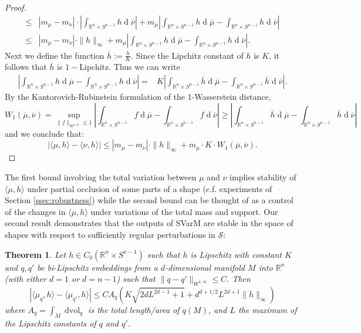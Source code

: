 \documentclass[11pt]{article}
\newtheorem{thm}{Theorem}
\newcommand{\R}{\mathbb{R}}
\begin{document}
\begin{proof}
\begin{align*}
    \leq& |m_\mu-m_\nu|\cdot\left|\int_{\R^n\times S^{n-1}}h \operatorname{d} \overline{\nu}\right|+m_\mu\left|\int_{\R^n\times S^{n-1}} h \operatorname{d} \overline{\mu} - \int_{\R^n\times S^{n-1}} h \operatorname{d} \overline{\nu}\right|\\
    \leq& |m_\mu-m_\nu|\cdot\|h\|_\infty+m_\mu\left|\int_{\R^n\times S^{n-1}} h \operatorname{d} \overline{\mu} - \int_{\R^n\times S^{n-1}} h \operatorname{d} \overline{\nu}\right|. 
\end{align*}
Next we define the function $\overline{h} := \frac{h}{K}$. Since the Lipchitz constant of $h$ is $K$, it follows that $\overline{h}$ is $1-$Lipchitz. Thus we can write
\begin{align*}
    \left|\int_{\R^n\times S^{n-1}} h \operatorname{d} \overline{\mu} - \int_{\R^n\times S^{n-1}} h \operatorname{d} \overline{\nu}\right| = &K\left|\int_{\R^n\times S^{n-1}} \overline{h} \operatorname{d} \overline{\mu} - \int_{\R^n\times S^{n-1}} \overline{h} \operatorname{d} \overline{\nu}\right|.
\end{align*}
By the Kantorovich-Rubinstein formulation of the 1-Wasserstein distance,
\begin{equation*}
    W_1(\overline{\mu},\overline{\nu}) = \sup_{\|f\|_{W^{1,\infty}}\leq 1}\left|\int_{\R^n\times S^{n-1}} f \operatorname{d} \overline{\mu} - \int_{\R^n\times S^{n-1}} f \operatorname{d} \overline{\nu}\right|\geq\left|\int_{\R^n\times S^{n-1}} \overline{h} \operatorname{d} \overline{\mu} - \int_{\R^n\times S^{n-1}} \overline{h} \operatorname{d} \overline{\nu}\right|
\end{equation*}
and we conclude that:
\begin{equation*}
    |\langle\mu,h\rangle-\langle\nu,h\rangle| \leq |m_\mu-m_\nu|\cdot\|h\|_\infty+m_\mu\cdot K\cdot W_1(\overline{\mu},\overline{\nu}).
\end{equation*}
\end{proof}
The first bound involving the total variation between $\mu$ and $\nu$ implies stability of $\langle \mu, h\rangle$ under partial occlusion of some parts of a shape (c.f. experiments of Section \ref{ssec:robustness}) while the second bound can be thought of as a control of the changes in $\langle \mu, h\rangle$ under variations of the total mass and support. Our second result demonstrates that the outputs of SVarM are stable in the space of shapes with respect to sufficiently regular perturbations in $\mathcal{S}$:
\begin{thm}\label{thm:stability_shape}
    Let $h\in C_0(\R^n\times S^{n-1})$ such that $h$ is Lipschitz with constant $K$ and $q,q'$ be bi-Lipschitz embeddings from a $d$-dimensional manifold $M$ into $\R^{n}$ (with either $d=1$ or $d=n-1$) such that $\|q - q'\|_{W^{1,\infty}} \leq C$. Then 
    \begin{equation}
        |\langle\mu_{q},h\rangle - \langle\mu_{q'},h\rangle| \leq CA_q(K\sqrt{2dL^{2d-1} + 1}+d^{d+1/2}L^{2d+1}\|h\|_{\infty})
    \end{equation}
    where $A_q = \int_M\operatorname{d vol}_q$ is the total length/area of $q(M)$, and $L$ the maximum of the Lipschitz constants of $q$ and $q'$.
\end{thm}
\end{document}
